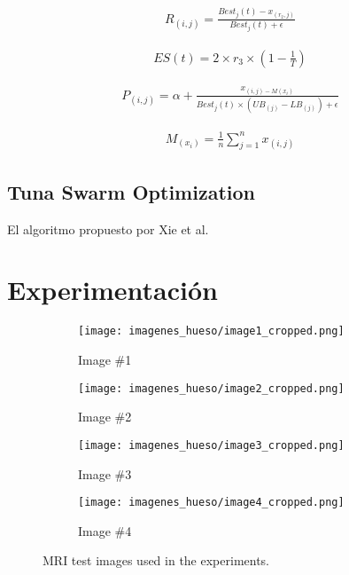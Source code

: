 \documentclass[conference]{IEEEtran}
\begin{document}
\begin{equation}
\begin{gathered}
R_{(i,j)}=\frac{Best_j(t) - x_{(r_2,j)}}{Best_j(t) +\epsilon}
\end{gathered}
\label{eq36}
\end{equation}

\begin{equation}
\begin{gathered}
ES(t)=2 \times r_3 \times (1 - \frac{1}{T})
\end{gathered}
\label{eq37}
\end{equation}

\begin{equation}
\begin{gathered}
P_{(i,j)}=\alpha + \frac{x_{(i,j) - M(x_i)}}{Best_j(t) \times (UB_{(j)}-LB_{(j)})+\epsilon} 
\end{gathered}
\label{eq38}
\end{equation}

\begin{equation}
\begin{gathered}
M_{(x_i)} = \frac{1}{n} \sum_{j=1}^{n} x_{(i,j)}
\end{gathered}
\label{eq39}
\end{equation}

\subsection{Tuna Swarm Optimization}

El algoritmo propuesto por Xie et al.~\cite{Xie2021}

\section{Experimentación} \label{sec:ce}


\begin{figure}
    \centering

    \begin{subfigure}{0.2\textwidth}
        \texttt{[image: imagenes\_hueso/image1\_cropped.png]}
        \caption{Image \#1}
    \end{subfigure}
    
    \begin{subfigure}{0.2\textwidth}
        \texttt{[image: imagenes\_hueso/image2\_cropped.png]}
        \caption{Image \#2}
    \end{subfigure}
    
    \begin{subfigure}{0.2\textwidth}
        \texttt{[image: imagenes\_hueso/image3\_cropped.png]}
        \caption{Image \#3}
    \end{subfigure}
    
    \begin{subfigure}{0.2\textwidth}
        \texttt{[image: imagenes\_hueso/image4\_cropped.png]}
        \caption{Image \#4}
    \end{subfigure}

    \caption{MRI test images used in the experiments.}
\end{figure}
\end{document}
